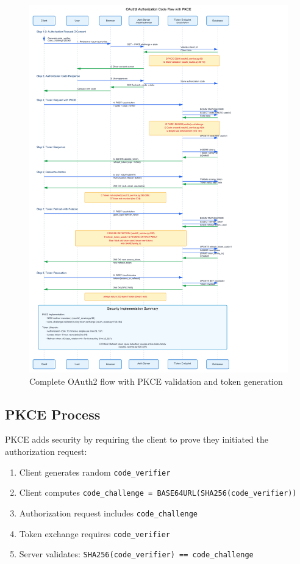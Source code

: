 \documentclass[12pt,a4paper]{article}
\begin{document}
\begin{landscape}
\begin{figure}[H]
    \centering
    \includegraphics[width=\linewidth,height=0.85\textheight,keepaspectratio]{diagrams/3_oauth2_sequence.png}
    \caption{Complete OAuth2 flow with PKCE validation and token generation}
    \label{fig:oauth2}
\end{figure}
\end{landscape}

\subsection{PKCE Process}

PKCE adds security by requiring the client to prove they initiated the authorization request:

\begin{enumerate}
    \item Client generates random \texttt{code\_verifier}
    \item Client computes \texttt{code\_challenge = BASE64URL(SHA256(code\_verifier))}
    \item Authorization request includes \texttt{code\_challenge}
    \item Token exchange requires \texttt{code\_verifier}
    \item Server validates: \texttt{SHA256(code\_verifier) == code\_challenge}
\end{enumerate}
\end{document}
